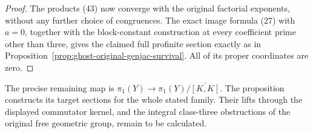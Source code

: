 \begin{proof}
The products (43) now converge with the original
factorial exponents, without any further choice
of congruences. The exact image formula (27) with
\(a=0\), together with the block-constant
construction at every coefficient prime other
than three, gives the claimed full profinite
section exactly as in
Proposition~\ref{prop:ghost-original-genjac-survival}.
All of its proper coordinates are zero.
\end{proof}

The precise remaining map is
\(\pi_1(Y)\to\pi_1(Y)/\overline{[K,K]}\).
The proposition constructs its target sections
for the whole stated family. Their lifts through
the displayed commutator kernel, and the integral
class-three obstructions of the original free
geometric group, remain to be calculated.
